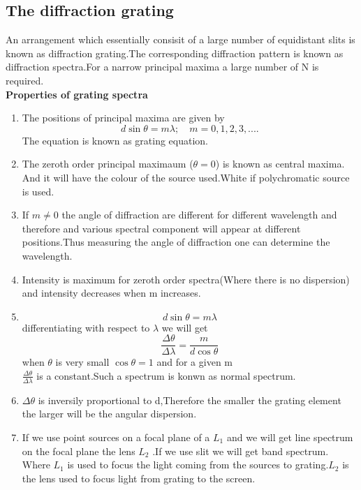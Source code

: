 \subsection{The diffraction grating}
 An arrangement which essentially consisit of a large number of equidistant slits is known as diffraction grating.The corresponding diffraction pattern is known as diffraction spectra.For a narrow principal maxima a large number of N is required.\\
 \textbf{Properties of grating spectra}
 \begin{enumerate}
 	\item The positions of principal maxima are given by \\
 	$$d\sin \theta=m\lambda; \quad m=0,1,2,3,....$$
 	The equation is known as grating equation.
 	\item The zeroth order principal maximaum ($\theta
 	=0$) is known as central maxima. And it will have the colour of the source used.White if polychromatic source is used.
 	\item If $m\neq0$ the angle of diffraction are different for different wavelength and therefore and various spectral component will appear at different positions.Thus  measuring the angle of diffraction one can determine the wavelength.
 	\item Intensity is maximum for zeroth order spectra(Where there is no dispersion) and intensity decreases when m increases.
 	\item $$d\sin \theta=m\lambda$$ differentiating with respect to $\lambda$ we will get\\
 	$$\frac{\Delta \theta}{\Delta \lambda}=\frac{m}{d \cos \theta}$$
 	when $\theta$ is very small $\cos\theta=1$ and for a given m \\
 	$\frac{\Delta \theta}{\Delta \lambda}$ is a constant.Such a spectrum is konwn as normal spectrum.
 	\item $\Delta \theta$ is inversily proportional to d,Therefore the smaller the grating element the larger will be the angular dispersion.
 	\item If we use point sources on a focal plane of a $L_1$ and we will get line spectrum on the focal plane the lens $L_2$ .If we use slit we will get band spectrum.
 	Where $L_1$ is used to focus the light coming from the sources to grating.$L_2$ is the lens used to focus light from grating to the screen.
 \end{enumerate}
